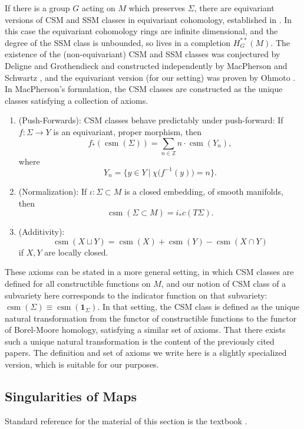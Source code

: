 \documentclass[11pt]{article}
\theoremstyle{plain}
\theoremstyle{definition}
\theoremstyle{definition}
\DeclareMathOperator{\csm}{csm}
\begin{document}
If there is a group $G$ acting on $M$ which preserves $\Sigma$, there are equivariant versions of CSM and SSM classes in equivariant cohomology, established in \cite{OHMOTO_2006}. In this case the equivariant cohomology rings are infinite dimensional, and the degree of the SSM class is unbounded, so lives in a completion $H^{**}_G(M)$. The existence of the (non-equivariant) CSM and SSM classes was conjectured by Deligne and Grothendieck and constructed independently by MacPherson \cite{macpherson} and Schwartz \cite{schwartz}, and the equivariant version (for our setting) was proven by Ohmoto \cite{ohm24}. In MacPherson's formulation, the CSM classes are constructed as the unique classes satisfying a collection of axioms. 
\begin{enumerate}
\item (Push-Forwards): CSM classes behave predictably under push-forward: If $f:\Sigma \to Y$ is an equivariant, proper morphism, then
\[
f_*(\csm(\Sigma)) =\sum_{n\in\mathbb Z} n\cdot\csm(Y_n),
\]
where
\[
Y_n = \big\{y \in Y\ |\ \chi\big( f^{-1}(y)\big)=n\big\}.
\]

\item  (Normalization): If $\iota: \Sigma\subset M$ is a closed embedding, of smooth manifolds, then 
\[
\csm(\Sigma\subset M)=i_*c(T\Sigma).
\]

\item (Additivity): 
\[
\csm(X\sqcup Y) = \csm(X) + \csm(Y) - \csm( X \cap Y)
\]
if $X,Y$ are locally closed. 
\end{enumerate}

These axioms can be stated in a more general setting, in which CSM classes are defined for all constructible functions on $M$, and our notion of CSM class of a subvariety here corresponds to the indicator function on that subvariety: $\csm(\Sigma)\equiv \csm(\textbf{1}_\Sigma)$. In that setting, the CSM class is defined as the unique natural transformation from the functor of constructible functions to the functor of Borel-Moore homology, satisfying a similar set of axioms. That there exists such a unique natural transformation is the content of the previously cited papers. The definition and set of axioms we write here is a slightly specialized version, which is suitable for our purposes. 

\subsection{Singularities of Maps}

Standard reference for the material of this section is the textbook \cite{mn20}. 
\end{document}
